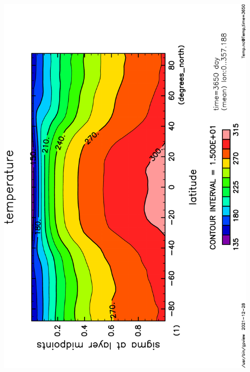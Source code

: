 \documentclass[aspectratio=149,9pt,fleqn]{beamer}
\begin{document}
\begin{frame}
\begin{columns}
\begin{column}{.4\textwidth}
		\end{column}
		\begin{column}{.4\textwidth}
			\includegraphics[height=\textwidth,angle=-90]{S1600Temp,time=3650-crop.pdf}
		\end{column}
	\end{columns}
\end{frame}
\end{document}
